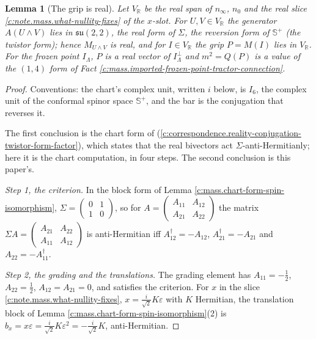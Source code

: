 \documentclass[11pt]{article}
\newtheorem{lemma}[theorem]{Lemma}
\theoremstyle{definition}
\theoremstyle{plain}
\newcommand{\changedmark}[2]{\marginpar{\raggedright\scriptsize\color{#1}#2}}
\providecommand{\CS}{}\renewcommand{\CS}{{\mathbb{S}^{+}}}
\providecommand{\R}{}\renewcommand{\R}{\mathbb{R}}
\begin{document}
\begin{lemma}[The grip is real]\label{c:mass.grip-real}
\changedmark{gray}{reworded}
Let $V_{\R}$ be the real span of $n_{\infty}$, $n_{0}$ and the real slice \ref{c:note.mass.what-nullity-fixes} of the $x$-slot. For $U, V \in V_{\R}$ the generator $A(U\wedge V)$ lies in $\mathfrak{su}(2,2)$, the real form of $\Sigma$, the reversion form of $\CS$ (the twistor form); hence $M_{U\wedge V}$ is real, and for $I \in V_{\R}$ the grip $P = M(I)$ lies in $V_{\R}$. For the frozen point $I_{\Lambda}$, $P$ is a real vector of $I_{\Lambda}^{\perp}$ and $m^{2} = Q(P)$ is a value of the $(1,4)$ form of Fact \ref{c:mass.imported-frozen-point-tractor-connection}.
\end{lemma}
\begin{proof}
Conventions: the chart's complex unit, written $i$ below, is $I_{6}$, the complex unit of the conformal spinor space $\CS$, and the bar is the conjugation that reverses it.

The first conclusion is the chart form of \cite[Prop.~4.5(2)]{ButlerT9} (\ref{c:correspondence.reality-conjugation-twistor-form-factor}), which states that the real bivectors act $\Sigma$-anti-Hermitianly; here it is the chart computation, in four steps. The second conclusion is this paper's.

\emph{Step 1, the criterion.} In the block form of Lemma \ref{c:mass.chart-form-spin-isomorphism}, $\Sigma = \left(\begin{smallmatrix} 0 & 1 \\ 1 & 0\end{smallmatrix}\right)$, so for $A = \left(\begin{smallmatrix} A_{11} & A_{12} \\ A_{21} & A_{22}\end{smallmatrix}\right)$ the matrix $\Sigma A = \left(\begin{smallmatrix} A_{21} & A_{22} \\ A_{11} & A_{12}\end{smallmatrix}\right)$ is anti-Hermitian iff $A_{12}^{\dagger} = -A_{12}$, $A_{21}^{\dagger} = -A_{21}$ and $A_{22} = -A_{11}^{\dagger}$.

\emph{Step 2, the grading and the translations.} The grading element has $A_{11} = -\tfrac12$, $A_{22} = \tfrac12$, $A_{12} = A_{21} = 0$, and satisfies the criterion. For $x$ in the slice \ref{c:note.mass.what-nullity-fixes}, $x = \tfrac{i}{\sqrt2}K\varepsilon$ with $K$ Hermitian, the translation block of Lemma \ref{c:mass.chart-form-spin-isomorphism}(2) is $b_{x} = x\varepsilon = \tfrac{i}{\sqrt2}K\varepsilon^{2} = -\tfrac{i}{\sqrt2}K$, anti-Hermitian.


\end{proof}
\end{document}
